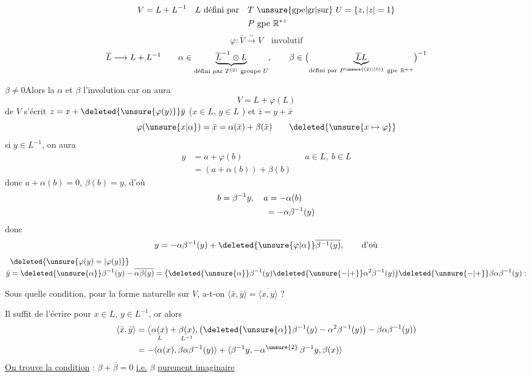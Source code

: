 \[
\begin{aligned}
 V&=L+L^{-1} & L\ \text{défini par}\quad &T\ \text{\unsure{gpe|gr|sur}}\ U=\{z,\lvert z\rvert=1\}\\
 &&&P\ \text{gpe}\ \mathbb R^{*+}
\end{aligned}
\]
\[
 \varphi:\overline V\xrightarrow{\sim}V\quad\text{involutif}
\]
\[
 \overline L\longrightarrow L+L^{-1}\qquad
 \alpha\in\underbrace{\overline L^{-1}\otimes L}_{\text{défini par }T^{(2)}\ \text{groupe }U},
 \qquad \beta\in\bigl(\underbrace{\overline L L}_{\text{défini par }P^{\unsure{(2)|(0)}}\ \text{gpe}\ \mathbb R^{++}}\bigr)^{-1}
\]

$\boxed{\beta\ne0}$\qquad Alors la   $\alpha$ et $\beta$   l'involution car on aura
\[
 V=L+\varphi(L)
\]
  de $V$ s'écrit $z=x+\deleted{\unsure{\varphi(y)}}\bar y$ \quad ($x\in L$, $y\in L$ ) et $\bar z=y+\bar x$
\[
 \varphi(\unsure{x|\alpha})=\bar x=\alpha(\bar x)+\beta(\bar x)\qquad
 \deleted{\unsure{x\mapsto\varphi}}
\]
si $y\in L^{-1}$, on aura
\[
\begin{aligned}
 y&=a+\varphi(b) &&a\in L,\ b\in L\\
  &=(a+\alpha(b))+\beta(b)
\end{aligned}
\]
donc $a+\alpha(b)=0$, $\beta(b)=y$, d'où
\[
\begin{aligned}
 b&=\beta^{-1}y,\quad a=-\alpha(b)\\
 &\hphantom{=\beta^{-1}y,\quad a}=-\alpha\beta^{-1}(y)
\end{aligned}
\]
donc
\[
 y=-\alpha\beta^{-1}(y)+\deleted{\unsure{\varphi|\alpha}}\overline{\beta^{-1}(y)},\qquad\text{d'où}
\]
\[
 \begin{aligned}
 &\deleted{\unsure{\varphi(y)=|\varphi(y)}}\\[-2pt]
 \bar y&=\deleted{\unsure{\alpha}}\beta^{-1}(y)-\overline{\alpha\beta(y)}
 =\bigl(\deleted{\unsure{\alpha}}\beta^{-1}(y)\deleted{\unsure{-|+}}\alpha^2\beta^{-1}(y)\bigr)\deleted{\unsure{-|+}}\beta\alpha\beta^{-1}(y):
 \end{aligned}
\]

Sous quelle condition, pour la forme  naturelle sur $V$, a-t-on $\langle\bar x,\bar y\rangle=\overline{\langle x,y\rangle}$ ?

Il suffit de l'écrire pour $x\in L$, $y\in L^{-1}$, or alors
\[
 \begin{aligned}
 \langle\bar x,\bar y\rangle
 &=\bigl\langle\underset{L}{\alpha(x)}+\underset{L^{-1}}{\beta(x)},
       \bigl(\deleted{\unsure{\alpha}}\beta^{-1}(y)-\alpha^2\beta^{-1}(y)\bigr)-\beta\alpha\beta^{-1}(y))\\
 &=-\langle\alpha(x),\beta\alpha\beta^{-1}(y)\rangle+
 \langle\beta^{-1}y,-\alpha^{\unsure{2}}\,\beta^{-1}y,\beta(x)\rangle
 \end{aligned}
\]
\uline{On trouve la condition} : $\beta+\bar\beta=0$ \uline{i.e.} $\beta$ \uline{purement imaginaire}
